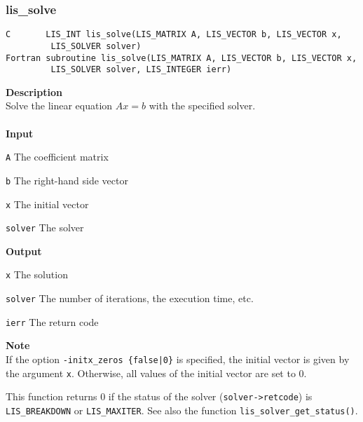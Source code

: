\documentclass[a4paper]{article}
\newcommand{\namelistlabel}[1]{\mbox{#1}\hfill}
\newenvironment{namelist}[1]{%
\begin{list}{}
  {\let\makelabel\namelistlabel
  \settowidth{\labelwidth}{#1}
  \setlength{\leftmargin}{1.1\labelwidth}}
  }{%
\end{list}}
\begin{document}
\subsubsection{lis\_solve}
\begin{screen}
\verb|C       LIS_INT lis_solve(LIS_MATRIX A, LIS_VECTOR b, LIS_VECTOR x,|\\
\verb|         LIS_SOLVER solver)|\\
\verb|Fortran subroutine lis_solve(LIS_MATRIX A, LIS_VECTOR b, LIS_VECTOR x,|\\
\verb|         LIS_SOLVER solver, LIS_INTEGER ierr)|
\end{screen}
{\bf Description}\\
\indent
Solve the linear equation $Ax = b$ with the specified solver.
\\ \\
\noindent
{\bf Input}
\begin{namelist}{XXXXXXXXXXXXXXXXXXXX}
\item[\tt A] The coefficient matrix
\item[\tt b] The right-hand side vector
\item[\tt x] The initial vector
\item[\tt solver] The solver
\end{namelist}
{\bf Output}
\begin{namelist}{XXXXXXXXXXXXXXXXXXXX}
\item[\tt x] The solution
\item[\tt solver] The number of iterations, the execution time, etc.
\item[\tt ierr] The return code
\end{namelist}
{\bf Note}\\
\indent
If the option {\tt -initx\_zeros \{false|0\}} is specified, the initial
vector is given by the argument {\tt x}.
Otherwise, all values of the initial vector are set to $0$.

This function returns 0 if the status of the solver ({\tt solver->retcode})
is {\tt LIS\_BREAKDOWN} or {\tt LIS\_MAXITER}. See also the function
{\tt lis\_solver\_get\_status()}. 

\newpage
\end{document}
